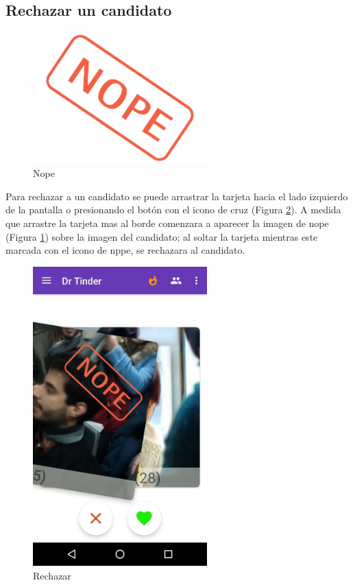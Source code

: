 \documentclass[10pt,letterpaper,extrafontsizes]{memoir}
\begin{document}
\subsection{Rechazar un candidato}

\begin{figure}[H]
    \centering
\includegraphics[width=0.6\textwidth]{graficos/imagenes/nope}
    \caption{Nope}
    \label{fig:nope}
\end{figure}

Para rechazar a un candidato se puede arrastrar la tarjeta hacia el lado izquierdo de la pantalla o presionando el botón con el icono de cruz (Figura \ref{fig:dnope}). A medida que arrastre la tarjeta mas al borde comenzara a aparecer la imagen de nope (Figura \ref{fig:nope}) sobre la imagen del candidato; al soltar la tarjeta mientras este marcada con el icono de nppe, se rechazara al candidato.

\begin{figure}[H]
    \centering
\includegraphics[width=0.6\textwidth]{graficos/capturas/r}
    \caption{Rechazar}
    \label{fig:dnope}
\end{figure}
\end{document}

